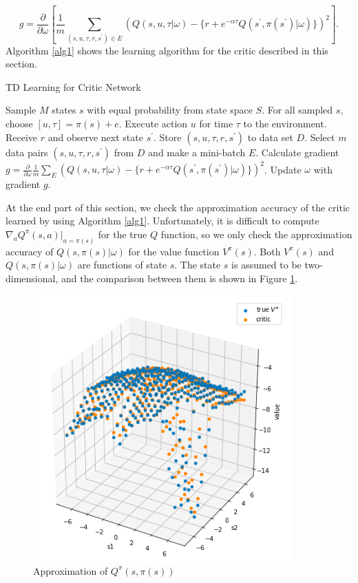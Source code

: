 \documentclass[english, dvipdfmx]{ampmt}             %
\newcommand{\pdif}[2]{\frac{\partial#1}{\partial#2}}
\begin{document}
\begin{equation}
	g = \pdif{}{\omega}\left[\frac{1}{m}\sum_{(s,u,\tau,r,s^{\prime})\in E}\left(Q(s,u,\tau|\omega) - \{r + e^{-\alpha\tau}Q(s^{\prime}, \pi(s^{\prime})|\omega)\}\right)^2\right].
\end{equation}
Algorithm \ref{alg1} shows the learning algorithm for the critic described in this section.
\begin{algorithm}                      
\caption{TD Learning for Critic Network}         
\label{alg1}                          
\begin{algorithmic}                  
    \STATE Sample $M$ states $s$ with equal probability from state space $S$.
    	\STATE For all sampled $s$, choose $[u, \tau]=\pi(s) + e$.
	\STATE Execute action $u$ for time $\tau$ to the environment.
	\STATE Receive $r$ and observe next state $s^{\prime}$.
	\STATE Store $(s, u, \tau, r, s^{\prime})$ to data set $D$.
    \ENDFOR
    	\STATE Select $m$ data pairs $(s, u, \tau, r, s^{\prime})$ from $D$ and make a mini-batch $E$.
	\STATE Calculate gradient $g = \pdif{}{\omega} \frac{1}{m}\sum_{E}\left(Q(s,u,\tau|\omega) - \{r + e^{-\alpha\tau}Q(s^{\prime}, \pi(s^{\prime})|\omega)\}\right)^2$.
	\STATE Update $\omega$ with gradient $g$.
    \ENDFOR
    \end{algorithmic}
\end{algorithm}\par
At the end part of this section, we check the approximation accuracy of the critic learned by using Algorithm \ref{alg1}. Unfortunately, it is difficult to compute $\nabla_aQ^{\pi}(s,a)|_{a=\pi(s)}$ for the true $Q$ function, so we only check the approximation accuracy of $Q(s,\pi(s)|\omega)$ for the value function $V^{\pi}(s)$. Both $V^{\pi}(s)$ and $Q(s, \pi(s)|\omega)$ are functions of state $s$. The state $s$ is assumed to be two-dimensional, and the comparison between them is shown in Figure \ref{Q_approximation}. 
\begin{figure}[H]
	\centering
 	\includegraphics[width=10cm]{Q_approximation.png}
 	\caption{Approximation of $Q^{\pi}(s,\pi(s))$} \label{Q_approximation}
\end{figure}
\end{document}
